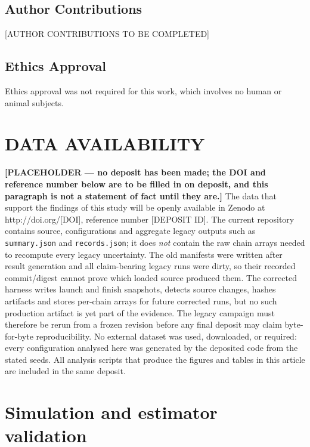 \documentclass[aip,jcp,reprint,amsmath,amssymb,floatfix]{revtex4-2}
\begin{document}
\subsection*{Author Contributions}
[AUTHOR CONTRIBUTIONS TO BE COMPLETED]

\subsection*{Ethics Approval}
Ethics approval was not required for this work, which involves no human or
animal subjects.

\section*{DATA AVAILABILITY}

\textbf{[PLACEHOLDER --- no deposit has been made; the DOI and reference number
below are to be filled in on deposit, and this paragraph is not a statement of
fact until they are.]} The data that support the findings of this study will be
openly available in Zenodo at http://doi.org/[DOI], reference number [DEPOSIT
ID].\cite{Deposit} The
current repository contains source, configurations and aggregate legacy outputs
such as \texttt{summary.json} and \texttt{records.json}; it does \emph{not}
contain the raw chain arrays needed to recompute every legacy uncertainty. The
old manifests were written after result generation and all claim-bearing legacy
runs were dirty, so their recorded commit/digest cannot prove which loaded source
produced them. The corrected harness writes launch and finish snapshots, detects
source changes, hashes artifacts and stores per-chain arrays for future corrected runs,
but no such production artifact is yet part of the evidence. The legacy campaign
must therefore be rerun from a frozen revision before any final deposit may claim
byte-for-byte reproducibility. No external dataset was used, downloaded, or
required: every configuration analysed here was generated by the deposited code
from the stated seeds. All analysis scripts that produce the figures and tables
in this article are included in the same deposit.

\appendix

\section{Simulation and estimator validation}
\label{app:validation}
\end{document}
